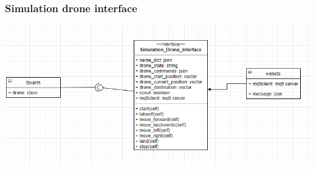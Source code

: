 \subsubsection{Simulation drone interface}
\includegraphics[width=\textwidth]{Latex/TECHDOCUMENT/simulation_drone_interface.PNG}

